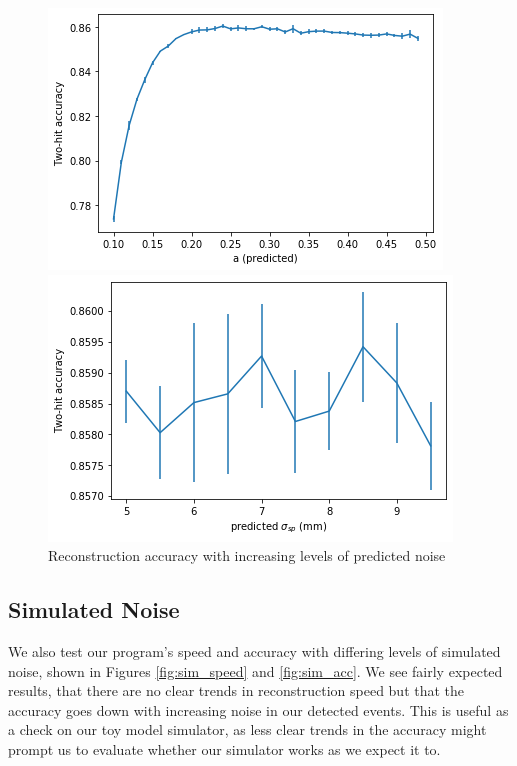 \begin{figure}
        \centering
        \begin{minipage}{0.49\textwidth} \centering
        \includegraphics[width=\textwidth]{graphs/pi_enFactor_acc.png}
        \end{minipage}
        \begin{minipage}{0.49\textwidth} \centering
        \includegraphics[width=\textwidth]{graphs/pi_spFactor_acc.png}
        \end{minipage}
        \caption{Reconstruction accuracy with increasing levels of predicted noise}
        \label{fig:predicted_acc}
\end{figure}

\subsection{Simulated Noise}
We also test our program's speed and accuracy with differing levels of simulated noise, shown in Figures \ref{fig:sim_speed} and \ref{fig:sim_acc}. We see fairly expected results, that there are no clear trends in reconstruction speed but that the accuracy goes down with increasing noise in our detected events. This is useful as a check on our toy model simulator, as less clear trends in the accuracy might prompt us to evaluate whether our simulator works as we expect it to.


